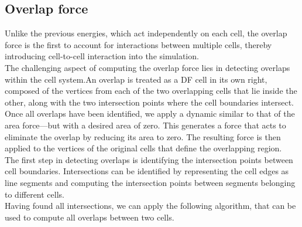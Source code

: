 \subsection{Overlap force}
Unlike the previous energies, which act independently on each cell, the overlap force is the first to account for interactions between multiple cells, thereby introducing cell-to-cell interaction into the simulation. \\
The challenging aspect of computing the overlap force lies in detecting overlaps within the cell system.An overlap is treated as a DF cell in its own right, composed of the vertices from each of the two overlapping cells that lie inside the other, along with the two intersection points where the cell boundaries intersect. \\ 
Once all overlaps have been identified, we apply a dynamic similar to that of the area force—but with a desired area of zero. 
This generates a force that acts to eliminate the overlap by reducing its area to zero. 
The resulting force is then applied to the vertices of the original cells that define the overlapping region. \\
The first step in detecting overlaps is identifying the intersection points between cell boundaries.
Intersections can be identified by representing the cell edges as line segments and computing the intersection points between segments belonging to different cells. \\
Having found all intersections, we can apply the following algorithm, that can be used to compute all overlaps between two cells. 

